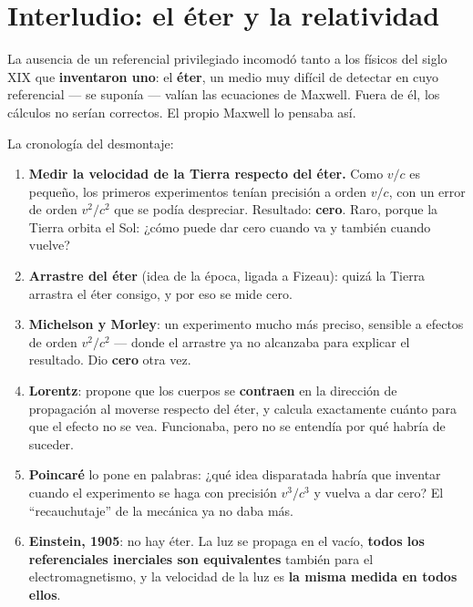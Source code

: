 \documentclass[12pt,a4paper]{article}
\begin{document}
\section{Interludio: el éter y la relatividad}

La ausencia de un referencial privilegiado incomodó tanto a los físicos del
siglo XIX que \textbf{inventaron uno}: el \textbf{éter}, un medio muy difícil
de detectar en cuyo referencial --- se suponía --- valían las ecuaciones de
Maxwell. Fuera de él, los cálculos no serían correctos. El propio Maxwell lo
pensaba así.

La cronología del desmontaje:

\begin{enumerate}
  \item \textbf{Medir la velocidad de la Tierra respecto del éter.} Como
        $v/c$ es pequeño, los primeros experimentos tenían precisión a orden
        $v/c$, con un error de orden $v^2/c^2$ que se podía despreciar.
        Resultado: \textbf{cero}. Raro, porque la Tierra orbita el Sol:
        ¿cómo puede dar cero cuando va y también cuando vuelve?
  \item \textbf{Arrastre del éter} (idea de la época, ligada a Fizeau): quizá
        la Tierra arrastra el éter consigo, y por eso se mide cero.
  \item \textbf{Michelson y Morley}: un experimento mucho más preciso,
        sensible a efectos de orden $v^2/c^2$ --- donde el arrastre ya no
        alcanzaba para explicar el resultado. Dio \textbf{cero} otra vez.
  \item \textbf{Lorentz}: propone que los cuerpos se \textbf{contraen} en la
        dirección de propagación al moverse respecto del éter, y calcula
        exactamente cuánto para que el efecto no se vea. Funcionaba, pero no
        se entendía por qué habría de suceder.
  \item \textbf{Poincaré} lo pone en palabras: ¿qué idea disparatada habría
        que inventar cuando el experimento se haga con precisión $v^3/c^3$ y
        vuelva a dar cero? El \enquote{recauchutaje} de la mecánica ya no
        daba más.
  \item \textbf{Einstein, 1905}: no hay éter. La luz se propaga en el vacío,
        \textbf{todos los referenciales inerciales son equivalentes} también
        para el electromagnetismo, y la velocidad de la luz es \textbf{la
        misma medida en todos ellos}.
\end{enumerate}
\end{document}
